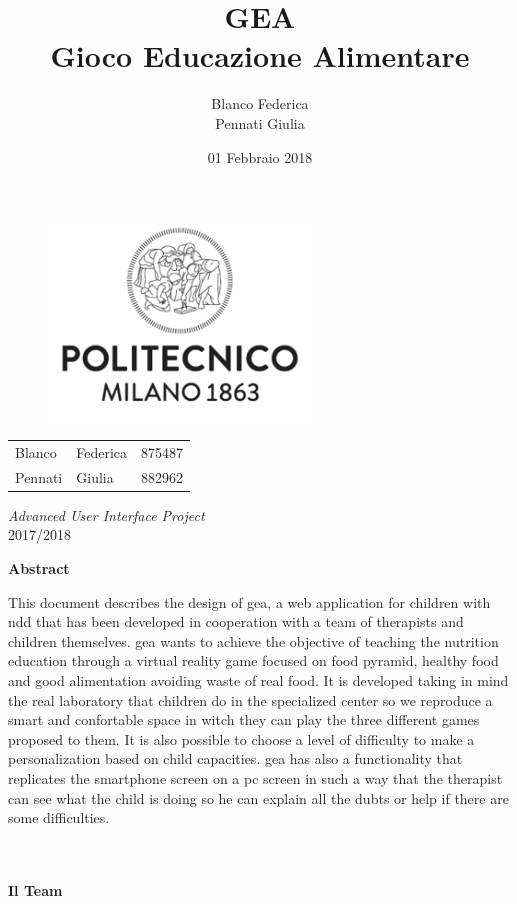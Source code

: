 \documentclass[a4paper, 12pt]{article}
\title{\textbf{GEA}\\[3mm]
Gioco Educazione Alimentare}
\author{Blanco Federica\\Pennati Giulia%
}
\date{01 Febbraio 2018} %
\makeatletter
\renewcommand{\maketitle}{ 
\begin{figure}[h]
\centering
\includegraphics[width=7cm]{Images/LogoPolimi}\\[.5cm]
\end{figure}

\vspace{50pt}

\begin{flushright} %
\@date 

{\huge\@title} %
\vspace{140pt} %


\begin{tabular}{ l l c}
\large Blanco &  \large Federica & \large 875487\\
\large Pennati & \large Giulia & \large 882962\\
\end{tabular}

\vspace{40pt} %
\end{flushright}
\centering
\textsl{\large Advanced User Interface Project}\\
2017/2018
}
\makeatother
\begin{document}
\begin{titlepage}

\thispagestyle{empty}
\maketitle %

\end{titlepage}

\clearpage
\begin{center}
\textbf{Abstract}\\
\end{center}
This document describes the design of \acs{gea}, a web application for children with \acl{ndd} that has been developed in cooperation with a team of therapists and children themselves. \acs{gea} wants to achieve the objective of teaching the nutrition education through a virtual reality game focused on food pyramid, healthy food and good alimentation avoiding waste of real food. It is developed taking in mind the real laboratory that children do in the specialized center so we reproduce a smart and confortable space in witch they can play the three different games proposed to them. It is also possible to choose a level of difficulty to make a personalization based on child capacities. \acs{gea} has also a functionality that replicates the smartphone screen on a pc screen in such a way that the therapist can see what the child is doing so he can explain all the dubts or help if there are some difficulties. %
\\
\\
\\
\begin{center}
\textbf{Il Team}\\
\end{center}
\vspace{20px}
\end{document}
